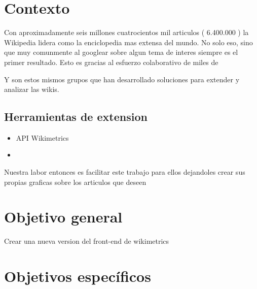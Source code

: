 
\section{Contexto}



Con aproximadamente seis millones cuatrocientos mil articulos ( 6.400.000 ) la Wikipedia lidera como la enciclopedia mas extensa del mundo. No solo eso, sino que muy comunmente al googlear sobre algun tema de interes siempre es el primer resultado.
Esto es gracias al esfuerzo colaborativo de miles de 





Y son estos mismos grupos que han desarrollado soluciones para extender y analizar las wikis.


\subsection*{Herramientas de extension }
\begin{itemize}
    \item API Wikimetrics
    \item
\end{itemize}


Nuestra labor entonces es facilitar este trabajo para ellos dejandoles crear sus propias graficas sobre los articulos que deseen

\section{Objetivo general}
Crear una nueva version del front-end de wikimetrics


\section{Objetivos específicos}

